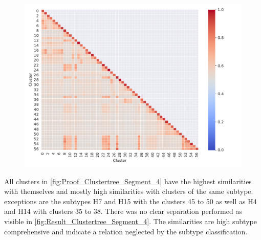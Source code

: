 \begin{figure}[hbt]
    \centering
    \includegraphics[width=\textwidth]{Results/Cluster_Difference_Segment_4.pdf}
    \caption[]{}
    \label{fig:Proof_Clustertree_Segment_4}
\end{figure}

All clusters in \autoref{fig:Proof_Clustertree_Segment_4} have the highest similarities with themselves and mostly high similarities with clusters of the same subtype. exceptions are the subtypes H7 and H15 with the clusters 45 to 50 as well as H4 and H14 with clusters 35 to 38. There was no clear separation performed as visible in \autoref{fig:Result_Clustertree_Segment_4}. The similarities are high subtype comprehensive and indicate a relation neglected by the subtype classification. 